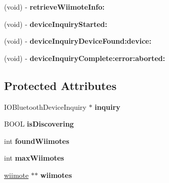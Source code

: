 \begin{DoxyCompactItemize}
\item 
\hypertarget{interface_wii_search_a3c8ae2c10fdfe311719d7da6e9bcfa7f}{(void) -\/ {\bfseries retrieve\-Wiimote\-Info\-:}}\label{interface_wii_search_a3c8ae2c10fdfe311719d7da6e9bcfa7f}

\item 
\hypertarget{interface_wii_search_ade01f115383cdd698af8927f28f63b1d}{(void) -\/ {\bfseries device\-Inquiry\-Started\-:}}\label{interface_wii_search_ade01f115383cdd698af8927f28f63b1d}

\item 
\hypertarget{interface_wii_search_a0657d3778a59f06a7e88f384bcbdef15}{(void) -\/ {\bfseries device\-Inquiry\-Device\-Found\-:device\-:}}\label{interface_wii_search_a0657d3778a59f06a7e88f384bcbdef15}

\item 
\hypertarget{interface_wii_search_ad98054ad882cc29eb6f216cd0bcddb0b}{(void) -\/ {\bfseries device\-Inquiry\-Complete\-:error\-:aborted\-:}}\label{interface_wii_search_ad98054ad882cc29eb6f216cd0bcddb0b}

\end{DoxyCompactItemize}
\subsection*{Protected Attributes}
\begin{DoxyCompactItemize}
\item 
\hypertarget{interface_wii_search_afb1943530cced0e23d58195b55978736}{I\-O\-Bluetooth\-Device\-Inquiry $\ast$ {\bfseries inquiry}}\label{interface_wii_search_afb1943530cced0e23d58195b55978736}

\item 
\hypertarget{interface_wii_search_a975efbb9edea1f450ea2219ea39da6f8}{B\-O\-O\-L {\bfseries is\-Discovering}}\label{interface_wii_search_a975efbb9edea1f450ea2219ea39da6f8}

\item 
\hypertarget{interface_wii_search_a5c1c217bc608641c4f8ff1d4818774eb}{int {\bfseries found\-Wiimotes}}\label{interface_wii_search_a5c1c217bc608641c4f8ff1d4818774eb}

\item 
\hypertarget{interface_wii_search_ab13e41ad50369c11d865f2f5ce2bd007}{int {\bfseries max\-Wiimotes}}\label{interface_wii_search_ab13e41ad50369c11d865f2f5ce2bd007}

\item 
\hypertarget{interface_wii_search_a1265894f8d63dfaec9011112b6cef3a4}{\hyperlink{structwiimote__t}{wiimote} $\ast$$\ast$ {\bfseries wiimotes}}\label{interface_wii_search_a1265894f8d63dfaec9011112b6cef3a4}

\end{DoxyCompactItemize}


